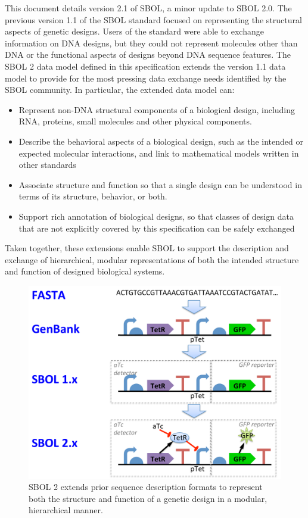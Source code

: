 This document details version 2.1 of SBOL, a minor update to SBOL 2.0.
The previous version 1.1 of the SBOL standard focused on representing the structural aspects of genetic designs. Users of the standard were able to exchange information on DNA designs, but they could not represent molecules other than DNA or the functional aspects of designs beyond DNA sequence features. The SBOL 2 data model defined in this specification extends the version 1.1 data model to provide for the most pressing data exchange needs identified by the SBOL community. In particular, the extended data model can:
\begin{itemize}

\item Represent non-DNA structural components of a biological design, including RNA, proteins, small molecules and other physical components.

\item Describe the behavioral aspects of a biological design, such as the intended or expected molecular interactions, and link to mathematical models written in other standards

\item Associate structure and function so that a single design can be understood in terms of its structure, behavior, or both.

\item Support rich annotation of biological designs, so that classes of design data that are not explicitly covered by this specification can be safely exchanged

\end{itemize}
Taken together, these extensions enable SBOL to support the description and exchange of hierarchical, modular representations of both the intended structure and function of designed biological systems.

\begin{figure}
\centering
\includegraphics[width=5in]{images/format-comparison.pdf}
\caption{SBOL 2 extends prior sequence description formats to represent both the structure and function of a genetic design in a modular, hierarchical manner.}
\label{f:sequence}
\end{figure}

